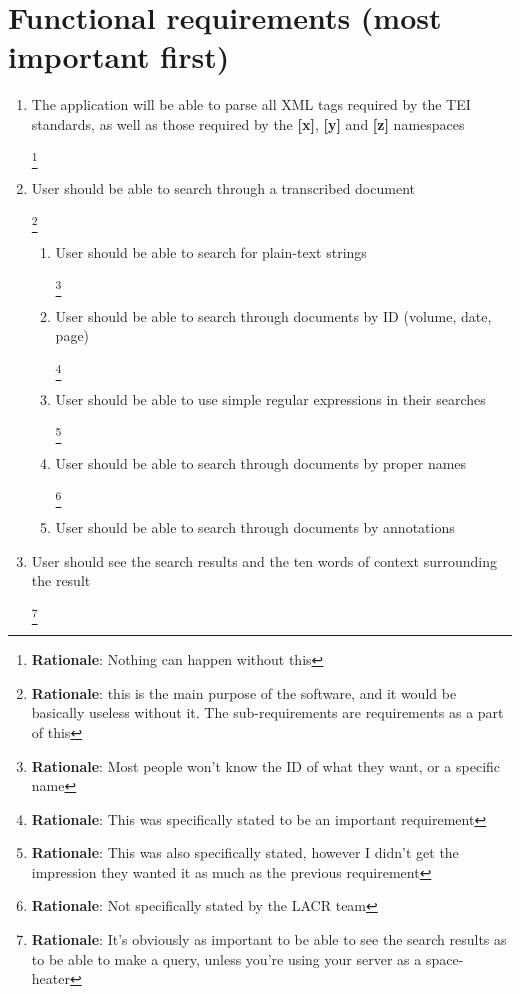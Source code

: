 \documentclass[10pt,a4paper]{report}
\newcommand{\rationale}[1]{
    \footnote{
        \textbf{Rationale}: #1
    }
}
\begin{document}
    \section*{Functional requirements (most important first)}
        \begin{enumerate}
            \item The application will be able to parse all XML tags required by the TEI standards, as well as those required by the \textbf{[x]}, \textbf{[y]} and \textbf{[z]} namespaces
            \rationale{Nothing can happen without this}

            \item User should be able to search through a transcribed document
            \rationale{this is the main purpose of the software, and it would be basically useless without it. The sub-requirements are requirements as a part of this}
                \begin{enumerate}
                    \item User should be able to search for plain-text strings
                    \rationale{Most people won't know the ID of what they want, or a specific name}
                    
                    \item User should be able to search through documents by ID (volume, date, page)
                    \rationale{This was specifically stated to be an important requirement}
                    
                    \item User should be able to use simple regular expressions in their searches
                    \rationale{This was also specifically stated, however I didn't get the impression they wanted it as much as the previous requirement}
                    
                    \item User should be able to search through documents by proper names
                    \rationale{Not specifically stated by the LACR team}
                    
                    \item User should be able to search through documents by  annotations
                \end{enumerate} 
   
            \item User should see the search results and the ten words of context surrounding the result
            \rationale{It's obviously as important to be able to see the search results as to be able to make a query, unless you're using your server as a space-heater}
            

\end{enumerate}
\end{document}
